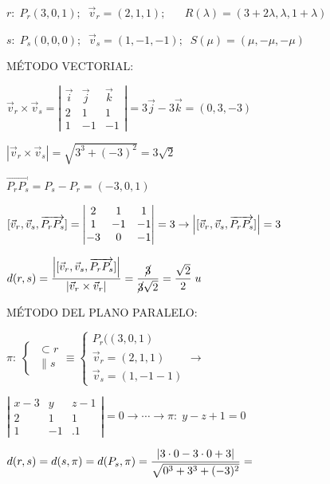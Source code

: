 \noindent $r:\; P_r(3,0,1);\;\; \vec v_r=(2,1,1);\;\; \;\;\;\;R(\lambda)=(3+2\lambda,\lambda,1+\lambda)$

\noindent $s:\; P_s(0,0,0);\;\; \vec v_s=(1,-1,-1);\;\;S(\mu)=(\mu,-\mu,-\mu)$

\vspace{5mm} \noindent MÉTODO VECTORIAL:

\vspace{3mm} \noindent $\vec v_r \times \vec v_s=\left| \begin{matrix} \vec i&\vec j&\vec k\\2&1&1\\1&-1&-1 \end{matrix} \right|=3\vec j-3\vec k=(0,3,-3)$

\noindent $|\vec v_r \times \vec v_s|=\sqrt{3^3+(-3)^2}=3\sqrt{2}$

\noindent $\overrightarrow{P_rP_s}=P_s-P_r=(-3,0,1)$

\noindent $[\vec v_r,\vec v_s,\overrightarrow{P_rP_s}]=\left|  \begin{matrix} 2&1&1\\1&-1&-1\\-3&0&-1\end{matrix} \right|=3 \to \abs{[\vec v_r,\vec v_s,\overrightarrow{P_rP_s}]}=3$

\noindent $d(r,s)=\dfrac {\abs{[\vec v_r,\vec v_s,\overrightarrow{P_rP_s}]}}{\abs{\vec v_r \times \vec v_r}}=\dfrac {\cancel{3}}{\cancel{3}\sqrt{2}}=\dfrac {\sqrt{2}}{2}\; u$

\vspace{5mm}\noindent MÉTODO DEL PLANO PARALELO:

\noindent $\pi:\;\begin{cases} \;\subset r \\ \;\parallel s \end{cases} \equiv \begin{cases} P_r((3,0,1)\\\vec v_r=(2,1,1)\\\vec v_s=(1,-1-1) \end{cases}\to$

\noindent $\left| \begin{matrix} x-3&y&z-1\\2&1&1\\1&-1&.1 \end{matrix} \right|=0 \to \cdots \to  \pi:\; y-z+1=0$

\noindent $d(r,s)=d(s,\pi)=d(P_s,\pi)=\dfrac {\abs{3\cdot 0-3\cdot 0+3}}{\sqrt{0^3+3^3+(-3)^2}}=$

